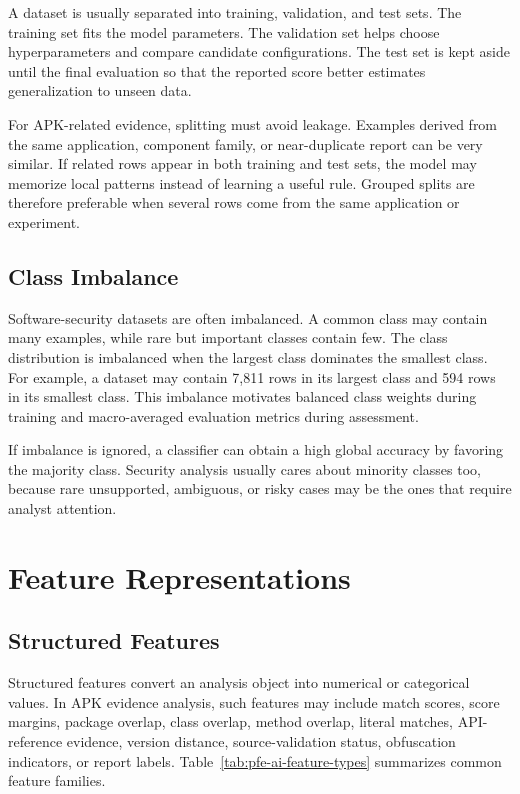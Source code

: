 A dataset is usually separated into training, validation, and test sets. The
training set fits the model parameters. The validation set helps choose
hyperparameters and compare candidate configurations. The test set is kept
aside until the final evaluation so that the reported score better estimates
generalization to unseen data.

For APK-related evidence, splitting must avoid leakage. Examples derived from
the same application, component family, or near-duplicate report can be very
similar. If related rows appear in both training and test sets, the model may
memorize local patterns instead of learning a useful rule. Grouped splits are
therefore preferable when several rows come from the same application or
experiment.

\subsection{Class Imbalance}

Software-security datasets are often imbalanced. A common class may contain
many examples, while rare but important classes contain few. The class
distribution is imbalanced when the largest class dominates the smallest
class. For example, a dataset may contain 7,811 rows in its largest class and
594 rows in its smallest class. This imbalance motivates balanced class
weights during training and macro-averaged evaluation metrics during
assessment.

If imbalance is ignored, a classifier can obtain a high global accuracy by
favoring the majority class. Security analysis usually cares about minority
classes too, because rare unsupported, ambiguous, or risky cases may be the
ones that require analyst attention.

\section{Feature Representations}

\subsection{Structured Features}

Structured features convert an analysis object into numerical or categorical
values. In APK evidence analysis, such features may include match scores,
score margins, package overlap, class overlap, method overlap, literal
matches, API-reference evidence, version distance, source-validation status,
obfuscation indicators, or report labels. Table~\ref{tab:pfe-ai-feature-types}
summarizes common feature families.


